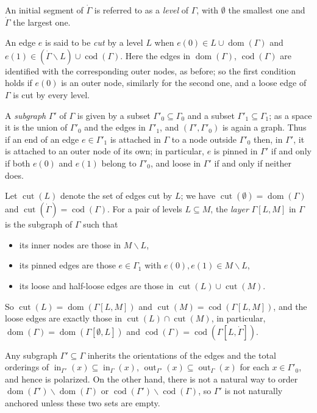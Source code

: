 \documentclass[12pt]{amsart}
\theoremstyle{plain}
\theoremstyle{definition}
\theoremstyle{remark}
\numberwithin{equation}{section}
\theoremstyle{plain}
\DeclareMathOperator{\dom}{dom}
\DeclareMathOperator{\cod}{cod}
\newcommand{\0}{\emptyset}
\newcommand{\sub}{\subseteq}
\newcommand{\mi}{\smallsetminus}
\DeclareMathOperator{\out}{out}
\newcommand{\memph}[1]{{\color{magenta}\emph{#1}}}
\DeclareMathOperator{\inn}{in}
\DeclareMathOperator{\cut}{cut}
\begin{document}
An initial segment of $\dot \Gamma$ is referred to as a \memph{level} of $\Gamma$, with $\0$ the smallest one and $\dot \Gamma$ the largest one.

An edge $e$ is said to be \memph{cut} by a level $L$ when $e(0) \in L \cup \dom(\Gamma)$ and $e(1) \in (\dot \Gamma \mi L) \cup \cod(\Gamma)$. Here the edges in $\dom(\Gamma)$, $\cod(\Gamma)$ are identified with the corresponding outer nodes, as before; so the first condition holds if $e(0)$ is an outer node, similarly for the second one, and a loose edge of $\Gamma$ is cut by every level.

A \memph{subgraph} $\Gamma'$ of $\Gamma$ is given by a subset $\Gamma'_0 \sub \Gamma_0$ and a subset $\Gamma'_1 \sub \Gamma_1$; as a space it is the union of $\Gamma'_0$ and the edges in $\Gamma'_1$, and $(\Gamma', \Gamma'_0)$ is again a graph. Thus if an end of an edge $e \in \Gamma'_1$ is attached in $\Gamma$ to a node outside $\Gamma'_0$ then, in $\Gamma'$, it is attached to an outer node of its own; in particular, $e$ is pinned in $\Gamma'$ if and only if both $e(0)$ and $e(1)$ belong to $\Gamma'_0$, and loose in $\Gamma'$ if and only if neither does.

Let $\cut(L)$ denote the set of edges cut by $L$; we have $\cut(\0) = \dom(\Gamma)$ and $\cut(\dot \Gamma)  = \cod(\Gamma)$. For a pair of levels $L \sub M$, the \memph{layer} $\Gamma[L, M]$ in $\Gamma$ is the subgraph of $\Gamma$ such that
\begin{itemize}
  \item its inner nodes are those in $M \mi L$,
  \item its pinned edges are those $e \in \Gamma_1$ with $e(0), e(1) \in M \mi L$,
  \item its loose and half-loose edges are those in $\cut(L) \cup \cut(M)$.
\end{itemize}
So $\cut(L) = \dom(\Gamma[L, M])$ and $\cut(M) = \cod(\Gamma[L, M])$, and the loose edges are exactly those in $\cut(L) \cap \cut(M)$, in particular, $\dom(\Gamma) = \dom(\Gamma[\0, L])$ and $\cod(\Gamma) = \cod(\Gamma[L, \dot \Gamma])$.



Any subgraph $\Gamma' \sub \Gamma$ inherits the orientations of the edges and the total orderings of $\inn_{\Gamma'}(x) \sub \inn_{\Gamma}(x)$, $\out_{\Gamma'}(x) \sub \out_{\Gamma}(x)$ for each $x \in \Gamma'_0$, and hence is  polarized. On the other hand, there is not a natural way to order $\dom(\Gamma') \mi \dom(\Gamma)$ or $\cod(\Gamma') \mi \cod(\Gamma)$, so $\Gamma'$ is not naturally anchored unless these two sets are empty.
\end{document}
